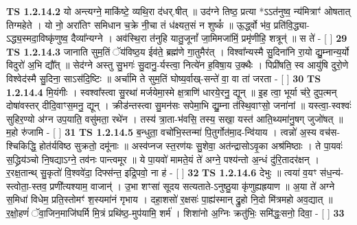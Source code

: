 \documentclass[17pt]{extarticle}
\begin{document}
                  \newline
                                \textbf{ TS 1.2.14.2} \newline
                  यो अन्त्यग्ने॒ माकि॑ष्टे॒ व्यथि॒रा द॑धर्.षीत् ॥ उद॑ग्ने तिष्ठ॒ प्रत्या *ऽऽत॑नुष्व॒ न्य॑मित्राꣳ॑ ओषतात् तिग्महेते । यो नो॒ अरा॑तिꣳ समिधान च॒क्रे नी॒चा तं ध॑क्ष्यत॒सं न शुष्कं᳚ ॥ ऊ॒र्द्ध्वो भ॑व॒ प्रति॑वि॒द्ध्या-ऽद्ध्य॒स्मदा॒विष्कृ॑णुष्व॒ दैव्या᳚न्यग्ने । अव॑स्थि॒रा त॑नुहि यातु॒जूनां᳚ जा॒मिमजा॑मिं॒ प्रमृ॑णीहि॒ शत्रून्॑ ॥ स ते॑ - [ ] \textbf{  29} \newline
                  \newline
                                \textbf{ TS 1.2.14.3} \newline
                  जानाति सुम॒तिं ॅय॑विष्ठ॒य ईव॑ते॒ ब्रह्म॑णे गा॒तुमैर॑त् । विश्वा᳚न्यस्मै सु॒दिना॑नि रा॒यो द्यु॒म्नान्य॒र्यो विदुरो॑ अ॒भि द्यौ᳚त् ॥ सेद॑ग्ने अस्तु सु॒भगः॑ सु॒दानु॒-र्यस्त्वा॒ नित्ये॑न ह॒विषा॒य उ॒क्थैः । पिप्री॑षति॒ स्व आयु॑षि दुरो॒णे विश्वेद॑स्मै सु॒दिना॒ साऽस॑दि॒ष्टिः ॥ अर्चा॑मि ते सुम॒तिं घोष्य॒र्वाख्-सन्ते॑ वा॒ वा ता॑ जरता - [ ] \textbf{  30} \newline
                  \newline
                                \textbf{ TS 1.2.14.4} \newline
                  मि॒यंगीः । स्वश्वा᳚स्त्वा सु॒रथा॑ मर्जयेमा॒स्मे क्ष॒त्राणि॑ धारये॒रनु॒ द्यून् ॥ इ॒ह त्वा॒ भूर्या च॑रे॒ दुप॒त्मन् दोषा॑वस्तर् दीदि॒वाꣳस॒मनु॒ द्यून् । क्रीड॑न्तस्त्वा सु॒मन॑सः सपेमा॒भि द्यु॒म्ना त॑स्थि॒वाꣳसो॒ जना॑नां ॥ यस्त्वा॒-स्वश्वः॑ सुहिर॒ण्यो अ॑ग्न उप॒याति॒ वसु॑मता॒ रथे॑न । तस्य॑ त्रा॒ता-भ॑वसि॒ तस्य॒ सखा॒ यस्त॑ आति॒थ्यमा॑नु॒षग् जुजो॑षत् ॥ म॒हो रु॑जामि - [ ] \textbf{  31} \newline
                  \newline
                                \textbf{ TS 1.2.14.5} \newline
                  ब॒न्धुता॒ वचो॑भि॒स्तन्मा॑ पि॒तुर्गोत॑मा॒द-न्वि॑याय । त्वन्नो॑ अ॒स्य वच॑स-श्चिकिद्धि॒ होत॑र्यविष्ठ सुक्रतो॒ दमू॑नाः ॥ अस्व॑प्नज स्त॒रण॑यः सु॒शेवा॒ अत॑न्द्रासोऽवृ॒का अश्र॑मिष्ठाः । ते पा॒यवः॑ स॒द्ध्रिय॑ञ्चो नि॒षद्याऽग्ने॒ तव॑नः पान्त्वमूर ॥ ये पा॒यवो॑ मामते॒यं ते॑ अग्ने॒ पश्य॑न्तो अ॒न्धं दु॑रि॒तादर॑क्षन् । र॒रक्ष॒तान्थ् सु॒कृतो॑ वि॒श्ववे॑दा॒ दिफ्स॑न्त॒ इद्रि॒पवो॒ ना ह॑ - [ ] \textbf{  32} \newline
                  \newline
                                \textbf{ TS 1.2.14.6} \newline
                  देभुः ॥ त्वया॑ व॒यꣳ स॑ध॒न्य॑-स्त्वोता॒-स्तव॒ प्रणी᳚त्यश्याम॒ वाजान्॑ । उ॒भा शꣳसा॑ सूदय सत्यताते-ऽनुष्ठु॒या कृ॑णुह्यह्रयाण ॥ अ॒या ते॑ अग्ने स॒मिधा॑ विधेम॒ प्रति॒स्तोमꣳ॑ श॒स्यमा॑नं गृभाय । दहा॒शसो॑ र॒क्षसः॑ पा॒ह्य॑स्मान् द्रु॒हो नि॒दो मि॑त्रमहो अव॒द्यात् ॥ र॒क्षो॒हणं॑ ॅवा॒जिन॒माजि॑घर्मि मि॒त्रं प्रथि॑ष्ठ॒-मुप॑यामि॒ शर्म॑ । शिशा॑नो अ॒ग्निः क्रतु॑भिः॒ समि॑द्धः॒सनो॒ दिवा॒ - [ ] \textbf{  33} \newline
\end{document}
